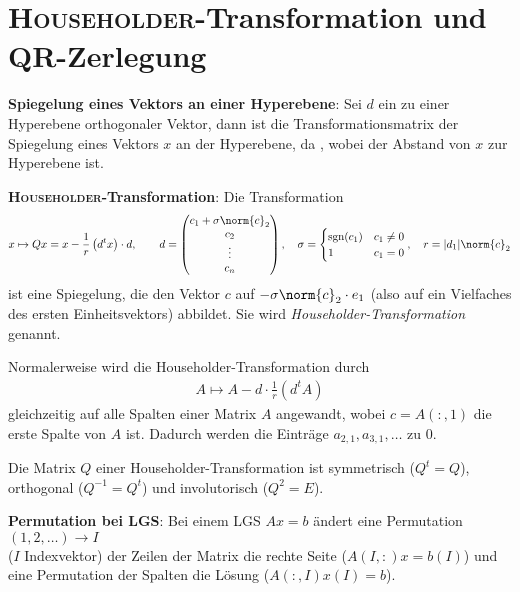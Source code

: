 \pagebreak

\section{%
    \textsc{Householder}-Transformation und QR-Zerlegung%
}

\textbf{Spiegelung eines Vektors an einer Hyperebene}:
Sei $d$ ein zu einer Hyperebene orthogonaler Vektor, dann ist
 die Transformationsmatrix
der Spiegelung eines Vektors $x$ an der Hyperebene,
da ,
wobei  der Abstand von $x$ zur
Hyperebene ist.

\linie

\textbf{\textsc{Householder}-Transformation}: Die Transformation
\begin{align*}
    x \mapsto Qx = x - \frac{1}{r} \left(d^t x\right) \cdot d, \qquad
    d = \begin{pmatrix}c_1 + \sigma \norm{c}_2 \\ c_2 \\ \vdots \\
    c_n\end{pmatrix}, \quad
    \sigma = \begin{cases}\sgn(c_1) & c_1 \not= 0 \\
    1 & c_1 = 0\end{cases}, \quad
    r = |d_1| \norm{c}_2
\end{align*}
ist eine Spiegelung, die den Vektor
$c$ auf $-\sigma \norm{c}_2 \cdot e_1$ (also auf ein Vielfaches des
ersten Einheitsvektors) abbildet.
Sie wird \emph{Householder-Transformation} genannt.

Normalerweise wird die Householder-Transformation durch
\begin{align*}
    A \mapsto A - d \cdot \frac{1}{r} \left(d^t A\right)
\end{align*}
gleichzeitig auf alle Spalten einer Matrix $A$ angewandt, wobei $c = A(:, 1)$
die erste Spalte von $A$ ist.
Dadurch werden die Einträge $a_{2,1}, a_{3,1}, \dotsc$ zu $0$.

Die Matrix $Q$ einer Householder-Transformation ist symmetrisch ($Q^t = Q$), \\
orthogonal ($Q^{-1} = Q^t$) und involutorisch ($Q^2 = E$).

\linie

\textbf{Permutation bei LGS}:
Bei einem LGS $Ax = b$ ändert eine Permutation
$(1, 2, \dotsc) \rightarrow I$ \\
($I$ Indexvektor) der Zeilen der Matrix die rechte Seite ($A(I,:) x = b(I)$)
und eine Permutation der Spalten die Lösung ($A(:,I) x(I) = b$).

